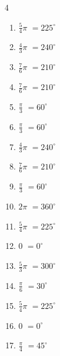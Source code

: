 \begin{multicols}{4}
\begin{enumerate}
  \item $\displaystyle \frac{5}{4}\pi$
        $\displaystyle =225^{\circ}$

  \item $\displaystyle \frac{4}{3}\pi$
        $\displaystyle =240^{\circ}$

\columnbreak %

\resetques

  \item $\displaystyle \frac{7}{6}\pi$
        $\displaystyle =210^{\circ}$

  \item $\displaystyle \frac{7}{6}\pi$
        $\displaystyle =210^{\circ}$

  \item $\displaystyle \frac{\pi}{3}$
        $\displaystyle =60^{\circ}$

  \item $\displaystyle \frac{\pi}{3}$
        $\displaystyle =60^{\circ}$

  \item $\displaystyle \frac{4}{3}\pi$
        $\displaystyle =240^{\circ}$

  \item $\displaystyle \frac{7}{6}\pi$
        $\displaystyle =210^{\circ}$

  \item $\displaystyle \frac{\pi}{3}$
        $\displaystyle =60^{\circ}$

  \item $\displaystyle 2\pi$
        $\displaystyle =360^{\circ}$

  \item $\displaystyle \frac{5}{4}\pi$
        $\displaystyle =225^{\circ}$

  \item $\displaystyle 0$
        $\displaystyle =0^{\circ}$

  \item $\displaystyle \frac{5}{3}\pi$
        $\displaystyle =300^{\circ}$

  \item $\displaystyle \frac{\pi}{6}$
        $\displaystyle =30^{\circ}$

  \item $\displaystyle \frac{5}{4}\pi$
        $\displaystyle =225^{\circ}$

  \item $\displaystyle 0$
        $\displaystyle =0^{\circ}$

  \item $\displaystyle \frac{\pi}{4}$
        $\displaystyle =45^{\circ}$


\end{enumerate}
\end{multicols}
